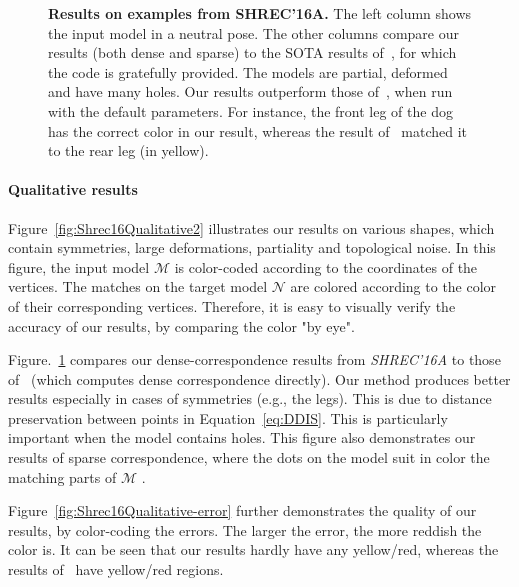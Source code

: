 \begin{figure}[b!]
\begin{tabular}[width=0.8\textwidth]{c|ccc}
	\end{tabular}
	\caption{{\textbf {Results on examples from SHREC'16A.}}
	The left column shows the input model in a neutral pose.
The other columns compare our results (both dense and sparse) to the SOTA results of~\cite{rodola2017partial}, for which the code is gratefully provided.
The models are partial, deformed and have many holes.
Our results outperform those of~\cite{rodola2017partial}, when run with the default parameters.
For instance, the front leg of the dog has the correct color in our result, whereas the result of~\cite{rodola2017partial} matched it to the rear leg (in yellow).
	}
	\label{fig:Shrec16Qualitative}
\end{figure}


\paragraph{Qualitative results}
Figure~\ref{fig:Shrec16Qualitative2} illustrates our results on various shapes, which contain symmetries, large deformations, partiality and topological noise.
In this figure, the input model $\mathcal{M}$ is color-coded according to the coordinates of the vertices.
The matches on the target model $\mathcal{N}$  are colored according to the color of their corresponding vertices.
Therefore, it is easy to visually verify the accuracy of our results, by comparing the color "by eye".

Figure.~\ref{fig:Shrec16Qualitative} compares our dense-correspondence results  from {\em SHREC'16A} to those of~\cite{rodola2017partial} (which computes dense correspondence directly).
Our method produces better results especially in cases of symmetries (e.g., the legs).
This is due to distance preservation between points in Equation~\ref{eq:DDIS}.
This is particularly important when the model contains holes.
This figure also demonstrates our results of sparse correspondence, where the dots on the model suit in color the matching parts of $\mathcal{M}$ .

Figure~\ref{fig:Shrec16Qualitative-error} further demonstrates the quality of our results, by color-coding the errors.
The larger the error, the more reddish the color is.
It can be seen  that our results hardly have any yellow/red, whereas the results of~\cite{rodola2017partial} have yellow/red regions.

